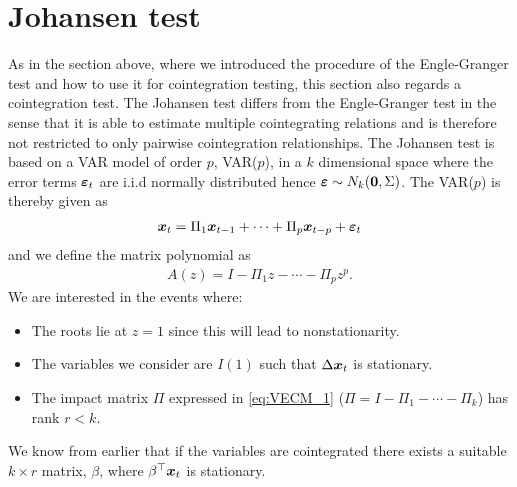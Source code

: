 \section{Johansen test}
As in the section above, where we introduced the procedure of the Engle-Granger test and how to use it for cointegration testing, this section also regards a cointegration test. The Johansen test differs from the Engle-Granger test in the sense that it is able to estimate multiple cointegrating relations and is therefore not restricted to only pairwise cointegration relationships. The Johansen test is based on a VAR model of order $p$, VAR($p$), in a $k$ dimensional space where the error terms $\boldsymbol{\varepsilon}_t$ are i.i.d normally distributed hence $\boldsymbol{\varepsilon}\sim N_k(\boldsymbol{0},\Sigma)$. The VAR($p$) is thereby given as
\begin{align}\label{eq:var_p_johansen}
\boldsymbol{x}_t=\Pi_1\boldsymbol{x}_{t-1}+\cdots+\Pi_p\boldsymbol{x}_{t-p}+\boldsymbol{\varepsilon}_t
\end{align}
and we define the matrix polynomial as
\begin{align*}
    A(z)=I-\Pi_1z-\cdots-\Pi_pz^p.
\end{align*}
We are interested in the events where: 
\begin{itemize}
    \item The roots lie at $z=1$ since this will lead to nonstationarity.
    \item The variables we consider are $I(1)$ such that $\Delta \boldsymbol{x}_t$ is stationary.
    \item The impact matrix $\Pi$ expressed in \eqref{eq:VECM_1} ($\Pi=I-\Pi_1-\cdots-\Pi_k$) has rank $r<k$.
\end{itemize}  
We know from earlier that if the variables are cointegrated there exists a suitable $k\times r$ matrix, $\beta$, where $\beta^\top \boldsymbol{x}_t$ is stationary.\\\\






